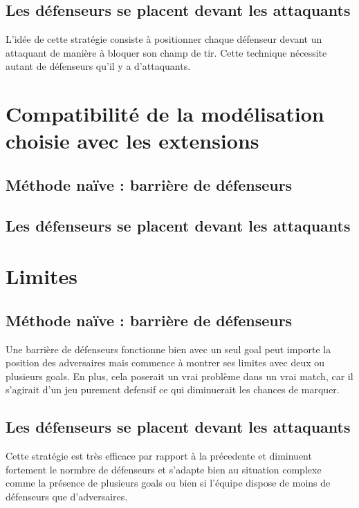 \documentclass{article}
\begin{document}
\subsection{Les défenseurs se placent devant les attaquants}
L'idée de cette stratégie consiste à positionner chaque défenseur devant un attaquant de manière à bloquer son champ de tir. Cette technique nécessite autant de défenseurs qu'il y a d'attaquants.


\section{Compatibilité de la modélisation choisie avec les extensions}


\subsection{Méthode naïve : barrière de défenseurs}

\subsection{Les défenseurs se placent devant les attaquants}

\section{Limites}

\subsection{Méthode naïve : barrière de défenseurs}
Une barrière de défenseurs fonctionne bien avec un seul goal peut importe la position des adversaires
mais commence à montrer ses limites avec deux ou plusieurs goals.
En plus, cela poserait un vrai problème dans un vrai match, car il s'agirait d'un jeu purement defensif
ce qui diminuerait les chances de marquer.

\subsection{Les défenseurs se placent devant les attaquants}
Cette stratégie est très efficace par rapport à la précedente et diminuent fortement le normbre de défenseurs et
s'adapte bien au situation complexe comme la présence de plusieurs goals ou bien si l'équipe dispose de moins de
défenseurs que d'adversaires.
\end{document}
